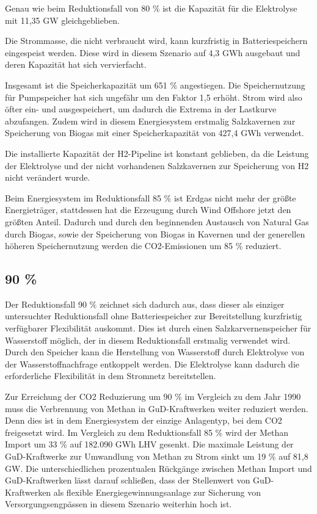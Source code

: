 Genau wie beim Reduktionsfall von 80 \% ist die Kapazität für die Elektrolyse mit 11,35 GW gleichgeblieben.

Die Strommasse, die nicht verbraucht wird, kann kurzfristig in Batteriespeichern eingespeist werden. Diese wird in diesem Szenario auf 4,3 GWh ausgebaut und deren Kapazität hat sich vervierfacht.

Insgesamt ist die Speicherkapazität um 651 \% angestiegen. Die Speichernutzung für Pumpspeicher hat sich ungefähr um den Faktor 1,5 erhöht. Strom wird also öfter ein- und ausgespeichert, um dadurch die Extrema in der Lastkurve abzufangen. Zudem wird in diesem Energiesystem erstmalig Salzkavernen zur Speicherung von Biogas mit einer Speicherkapazität von 427,4 GWh verwendet.

Die installierte Kapazität der H2-Pipeline ist konstant geblieben, da die Leistung der Elektrolyse und der nicht vorhandenen Salzkavernen zur Speicherung von H2 nicht verändert wurde.

Beim Energiesystem im Reduktionsfall 85 \% ist Erdgas nicht mehr der größte Energieträger, stattdessen hat die Erzeugung durch Wind Offshore jetzt den größten Anteil.
Dadurch und durch den beginnenden Austausch von Natural Gas durch Biogas, sowie der Speicherung von Biogas in Kavernen und der generellen höheren Speichernutzung werden die CO2-Emissionen um 85 \% reduziert.

\subsection{90 \%}
Der Reduktionsfall 90 \% zeichnet sich dadurch aus, dass dieser als einziger untersuchter Reduktionsfall ohne Batteriespeicher zur Bereitstellung kurzfristig verfüg\-barer Flexibilität auskommt. Dies ist durch einen Salzkarvernenspeicher für Wasserstoff möglich, der in diesem Reduktionsfall erstmalig verwendet wird. Durch den Speicher kann die Herstellung von Wasserstoff durch Elektrolyse von der Wasserstoffnachfrage entkoppelt werden. Die Elektrolyse kann dadurch die erforderliche Flexibilität in dem Stromnetz bereitstellen.

Zur Erreichung der CO2 Reduzierung um 90 \% im Vergleich zu dem Jahr 1990 muss die Verbrennung von Methan in GuD-Kraftwerken weiter reduziert werden. Denn dies ist in dem Energiesystem der einzige Anlagentyp, bei dem CO2 freigesetzt wird. Im Vergleich zu dem Reduktionsfall 85 \% wird der Methan Import um 33 \% auf 182.090 GWh LHV gesenkt. Die maximale Leistung der GuD-Kraftwerke zur Umwandlung von Methan zu Strom sinkt um 19 \% auf 81,8 GW. Die unterschiedlichen prozentualen Rückgänge zwischen Methan Import und GuD-Kraftwerken lässt darauf schließen, dass der Stellenwert von GuD-Kraftwerken als flexible Energiegewinnungsanlage zur Sicherung von Versorgungsengpässen in diesem Szenario weiterhin hoch ist.

